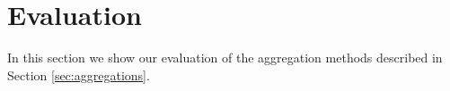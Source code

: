\section{Evaluation}\label{sec:evaluation}
In this section we show our evaluation of the aggregation methods described in Section \ref{sec:aggregations}.

